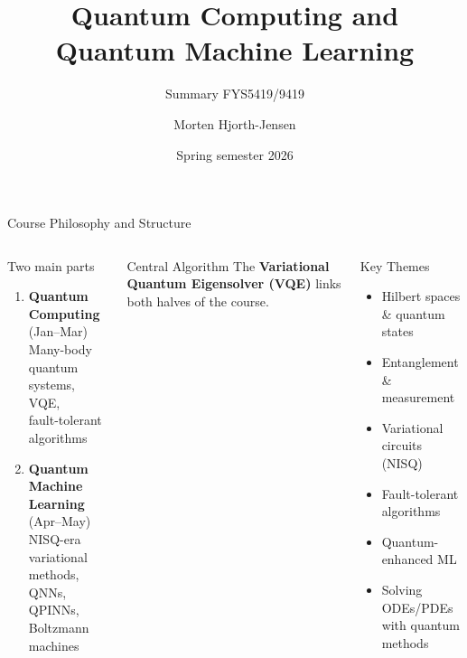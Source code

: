 \documentclass[aspectratio=169,12pt]{beamer}
\title{Quantum Computing and Quantum Machine Learning}
\subtitle{Summary FYS5419/9419}
\author{Morten Hjorth-Jensen}
\institute{Department of Physics, University of Oslo}
\date{Spring semester 2026}
\begin{document}
\begin{frame}[plain]
  \titlepage
\end{frame}

\begin{frame}{Course Philosophy and Structure}
  \begin{columns}[T]
      \begin{block}{Two main parts}
        \begin{enumerate}
          \item \textbf{Quantum Computing} (Jan--Mar)\\
                Many-body quantum systems, VQE,\\
                fault-tolerant algorithms
          \item \textbf{Quantum Machine Learning} (Apr--May)\\
                NISQ-era variational methods,\\
                QNNs, QPINNs, Boltzmann machines
        \end{enumerate}
      \end{block}
      \vspace{4pt}
      \begin{alertblock}{Central Algorithm}
        The \textbf{Variational Quantum Eigensolver (VQE)}
        links both halves of the course.
      \end{alertblock}
      \begin{block}{Key Themes}
        \begin{itemize}
          \item Hilbert spaces \& quantum states
          \item Entanglement \& measurement
          \item Variational circuits (NISQ)
          \item Fault-tolerant algorithms
          \item Quantum-enhanced ML
          \item Solving ODEs/PDEs with quantum methods
        \end{itemize}
      \end{block}
  \end{columns}
\end{frame}
\end{document}
